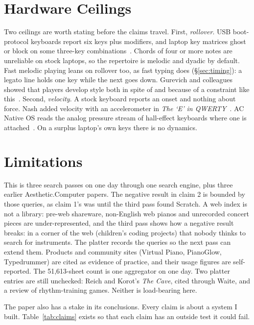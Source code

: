 \documentclass[10pt,letterpaper,twocolumn]{article}
\newcommand{\acdot}{{\color{acpink}.}}
\newcommand{\ac}{Aesthetic{\acdot}Computer}
\newcommand{\acos}{AC Native OS}
\begin{document}
\section{Hardware Ceilings}
\label{sec:ceilings}

Two ceilings are worth stating before the claims travel. First, \emph{rollover}. USB boot-protocol keyboards report six keys plus modifiers, and laptop key matrices ghost or block on some three-key combinations~\citep{msr_ghosting}. Chords of four or more notes are unreliable on stock laptops, so the repertoire is melodic and dyadic by default. Fast melodic playing leans on rollover too, as fast typing does (§\ref{sec:timing}): a legato line holds one key while the next goes down. Gurevich and colleagues showed that players develop style both in spite of and because of a constraint like this~\citep{gurevich2010style}. Second, \emph{velocity}. A stock keyboard reports an onset and nothing about force. Nash added velocity with an accelerometer in \emph{The `E' in QWERTY}~\citep{nash2016qwerty}. \acos{} reads the analog pressure stream of hall-effect keyboards where one is attached~\citep{scudder2026latency}. On a surplus laptop's own keys there is no dynamics.

\section{Limitations}
\label{sec:limits}

This is three search passes on one day through one search engine, plus three earlier \ac{} papers. The negative result in claim 2 is bounded by those queries, as claim 1's was until the third pass found Scratch. A web index is not a library: pre-web shareware, non-English web pianos and unrecorded concert pieces are under-represented, and the third pass shows how a negative result breaks: in a corner of the web (children's coding projects) that nobody thinks to search for instruments. The platter records the queries so the next pass can extend them. Products and community sites (Virtual Piano, PianoGlow, Typedrummer) are cited as evidence of practice, and their usage figures are self-reported. The 51{,}613-sheet count is one aggregator on one day. Two platter entries are still unchecked: Reich and Korot's \emph{The Cave}, cited through Waite, and a review of rhythm-training games. Neither is load-bearing here.

The paper also has a stake in its conclusions. Every claim is about a system I built. Table~\ref{tab:claims} exists so that each claim has an outside test it could fail.
\end{document}
